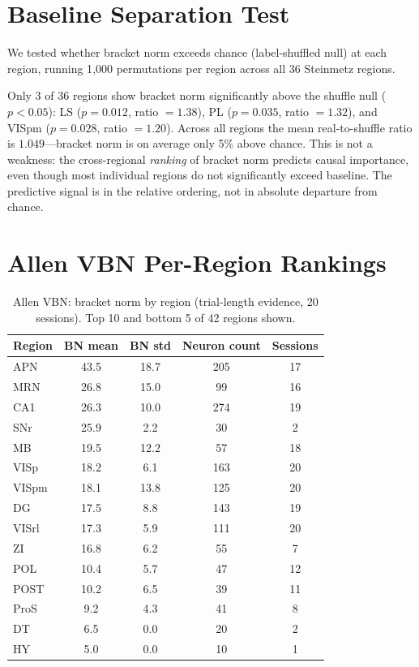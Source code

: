 \documentclass[9pt,lineno]{elife}
\begin{document}
\section{Baseline Separation Test}
\label{app:baseline}

We tested whether bracket norm exceeds chance (label-shuffled null) at each region, running 1{,}000 permutations per region across all 36 Steinmetz regions.

Only 3 of 36 regions show bracket norm significantly above the shuffle null ($p < 0.05$): LS ($p = 0.012$, ratio $= 1.38$), PL ($p = 0.035$, ratio $= 1.32$), and VISpm ($p = 0.028$, ratio $= 1.20$). Across all regions the mean real-to-shuffle ratio is $1.049$---bracket norm is on average only 5\% above chance. This is not a weakness: the cross-regional \emph{ranking} of bracket norm predicts causal importance, even though most individual regions do not significantly exceed baseline. The predictive signal is in the relative ordering, not in absolute departure from chance.

\section{Allen VBN Per-Region Rankings}
\label{app:vbn}

\begin{table}[h]
\centering
\caption{Allen VBN: bracket norm by region (trial-length evidence, 20 sessions). Top 10 and bottom 5 of 42 regions shown.}
\label{tab:vbn_regions}
\small
\begin{tabular}{lcccc}
\toprule
Region & BN mean & BN std & Neuron count & Sessions \\
\midrule
APN & 43.5 & 18.7 & 205 & 17 \\
MRN & 26.8 & 15.0 & 99 & 16 \\
CA1 & 26.3 & 10.0 & 274 & 19 \\
SNr & 25.9 & 2.2 & 30 & 2 \\
MB & 19.5 & 12.2 & 57 & 18 \\
VISp & 18.2 & 6.1 & 163 & 20 \\
VISpm & 18.1 & 13.8 & 125 & 20 \\
DG & 17.5 & 8.8 & 143 & 19 \\
VISrl & 17.3 & 5.9 & 111 & 20 \\
ZI & 16.8 & 6.2 & 55 & 7 \\
\midrule
POL & 10.4 & 5.7 & 47 & 12 \\
POST & 10.2 & 6.5 & 39 & 11 \\
ProS & 9.2 & 4.3 & 41 & 8 \\
DT & 6.5 & 0.0 & 20 & 2 \\
HY & 5.0 & 0.0 & 10 & 1 \\
\bottomrule
\end{tabular}
\end{table}
\end{document}
